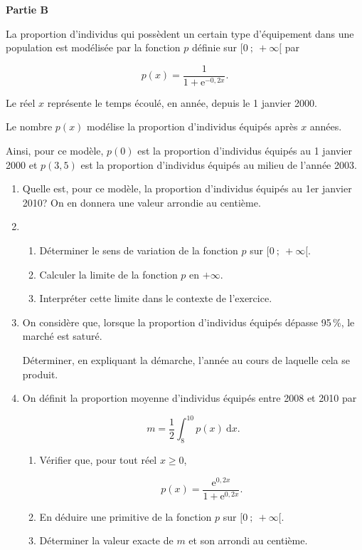 \documentclass{cornouaille}
\begin{document}
\begin{exercice}
\bigskip

\textbf{Partie B}

\medskip

La proportion d'individus qui possèdent un certain type d'équipement dans une
population est modélisée par la fonction $p$ définie sur $[0~;~+\infty[$ par

\[p(x) = \dfrac{1}{1 + \text{e}^{-0,2x}}.\]

Le réel $x$ représente le temps écoulé, en année, depuis le 1 janvier 2000.

Le nombre $p(x)$ modélise la proportion d'individus équipés après $x$ années.

Ainsi, pour ce modèle, $p(0)$ est la proportion d'individus équipés au 1 janvier 2000 et $p(3,5)$ est la proportion d'individus équipés au milieu de l'année 2003.

\medskip

\begin{enumerate}
\item Quelle est, pour ce modèle, la proportion d'individus équipés au 1er janvier
2010? On en donnera une valeur arrondie au centième.
\item 
	\begin{enumerate}
		\item Déterminer le sens de variation de la fonction $p$ sur $[0~;~+\infty[$.
		\item Calculer la limite de la fonction $p$ en $+\infty$.
		\item Interpréter cette limite dans le contexte de l'exercice.
 	\end{enumerate}
\item  On considère que, lorsque la proportion d'individus équipés dépasse 95\,\%, le
marché est saturé.
	
Déterminer, en expliquant la démarche, l'année au cours de laquelle cela se
produit.
\item  On définit la proportion moyenne d'individus équipés entre 2008 et 2010 par

\[m = \dfrac{1}{2}\displaystyle\int_8^{10} p(x)\:\text{d}x.\]
	
	\begin{enumerate}
		\item Vérifier que, pour tout réel $x \geqslant 0$,

\[p(x) = \dfrac{\text{e}^{0,2x}}{1 + \text{e}^{0,2x}}.\]

		\item En déduire une primitive de la fonction $p$ sur $[0~;~+\infty[$.
		\item Déterminer la valeur exacte de $m$ et son arrondi au centième.
	\end{enumerate}
\end{enumerate}
\end{exercice}
\end{document}
